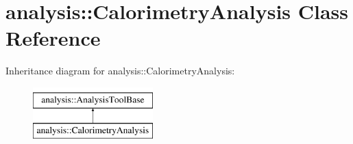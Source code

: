 \hypertarget{classanalysis_1_1CalorimetryAnalysis}{}\section{analysis\+:\+:Calorimetry\+Analysis Class Reference}
\label{classanalysis_1_1CalorimetryAnalysis}
Inheritance diagram for analysis\+:\+:Calorimetry\+Analysis\+:\begin{figure}[H]
\begin{center}
\leavevmode
\includegraphics[height=2.000000cm]{classanalysis_1_1CalorimetryAnalysis}
\end{center}
\end{figure}
